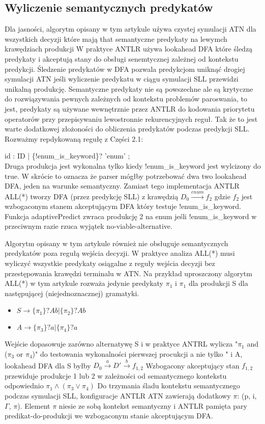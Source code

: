 ﻿\subsection{Wyliczenie semantycznych predykatów}
Dla jasności, algorytm opisany w tym artykule uźywa czystej
symulacji ATN dla wszystkich decyzji które mają that semantyczne predykaty
na lewymch krawędziach produkcji W praktyce ANTLR używa lookahead
DFA które śledzą predykaty i akceptują stany do obsługi senemtycznej
zależnej od kontekstu predykcji. Śledzenie predykatów w
DFA pozwala predykcjom uniknąć drogiej symulacji ATN jeśli
wyliczenie predykatu w ciągu symulacji SLL przewidzi unikalną
produkcję. Semantyczne predykaty nie są powszechne ale są krytyczne
do rozwiązywania pewnych zależnych od kontekstu problemów paroswania, to jest,
predykaty są używane wewnętrznie przez ANTLR do kodowania
priorytetu operatorów przy przepisywaniu lewostronnie rekurencyjnych reguł.
Tak że to jest warte dodatkowej złożoności do obliczenia
predykatów podczas predykcji SLL.
Rozważmy repdykowaną regułę z Części 2.1:
\par
id : ID | \{!enum_is_keyword\}? 'enum' ;
\\
Druga produkcja jest wykonalna tylko kiedy !enum_is_keyword
jest wylcizony do true. W skrócie to oznacza że parser mógłby
potrzebować dwa two lookahead DFA, jeden na warunke semantyczny.
Zamiast tego implementacja ANTLR ALL(*) tworzy DFA (przez
predykcję SLL) z krawędzią $D_0 \overset{enum}{\longrightarrow} f_2$
gdzie $f_2$ jest wzbogaconym stanem akceptującym DFA
który testuje !enum_is_keyword.
Funkcja adaptivePredict zwraca produkcję 2 na enum jeśli
!enum_is_keyword w przeciwnym razie rzuca wyjątek no-viable-alternative.
\par
Algorytm opisany w tym artykule również nie obsługuje
semantycznych predykatów poza regułą wejścia decyzji.
W praktyce analiza ALL(*) musi wyliczyć wszystkie predykaty osiągalne
z reguły wejścia decyzji bez przestępowania krawędzi terminalu
w ATN. Na przykład uproszczony algorytm ALL(*) w tym artykule rozważa jedynie
predykaty $\pi_1$ i $\pi_1$ dla produkcji S dla następującej (niejednoznacznej) gramatyki.
\begin{itemize}
\item $S\rightarrow \{\pi_1\}? Ab | \{\pi_2\}? Ab$
\item $A\rightarrow \{\pi_3\}? a | \{\pi_4\}? a$
\end{itemize}
Wejście dopasowuje zarówno alternatywę S i w praktyce
ANTRL wylicza "$\pi_1$ and ($\pi_3$ or $\pi_4$)" do testowania wykonalności
pierwszej procukcji a nie tylko "%
i A, lookahead DFA dla S byłby
$D_0\overset{a}{\rightarrow}D'\overset{b}{\rightarrow}f_{1,2}$
Wzbogacony akceptujący stan $f_{1,2}$ przewiduje produkcje
1 lub 2 w zależności od semantycznego kontekstu odpowiednio
$\pi_1 \wedge (\pi_3 \vee \pi_4)$
Do trzymania śladu kontekstu semantycznego podczas symulacji SLL,
konfiguracje ANTLR ATN
zawierają dodatkowy $\pi$: (p, i, $\Gamma$, $\pi$).
Element $\pi$ niesie ze sobą
kontekst semantyczny i ANTLR pamięta pary predikat-do-produkcji
we wzbogaconym stanie akceptującym DFA.